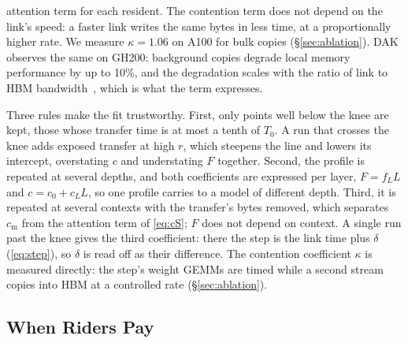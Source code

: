 attention term for each resident. The contention term does not depend on the
link's speed: a faster link writes the same bytes in less time, at a
proportionally higher rate. We measure $\kappa = 1.06$ on A100 for bulk copies
(\S\ref{sec:ablation}). DAK observes the same on GH200: background copies
degrade local memory performance by up to 10\%, and the degradation scales
with the ratio of link to HBM bandwidth~\cite{dak}, which is what the term
expresses.

Three rules make the fit trustworthy. First, only points well below the knee are
kept, those whose transfer time is at most a tenth of $T_0$. A run that crosses
the knee adds exposed transfer at high $r$, which steepens the line and lowers
its intercept, overstating $c$ and understating $F$ together. Second, the profile
is repeated at several depths, and both coefficients are expressed per layer,
$F = f_L L$ and $c = c_0 + c_L L$, so one profile carries to a model of
different depth. Third, it is repeated at several contexts with the
transfer's bytes removed, which separates $c_{\mathrm{m}}$ from the attention
term of \cref{eq:cS}; $F$ does not depend on context. A single run past the knee gives the third coefficient: there the step is
the link time plus $\delta$ (\cref{eq:step}), so $\delta$ is read off as their
difference. The contention
coefficient $\kappa$ is measured directly: the
step's weight GEMMs are timed while a second stream copies into HBM at a
controlled rate (\S\ref{sec:ablation}).

\subsection{When Riders Pay}\label{sec:pays}

